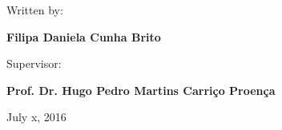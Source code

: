 \vspace{0.5cm}
\begin{center}
\begin{normalsize}
\begin{large}
Written by:
\end{large}
\end{normalsize}
\end{center}

\vspace{0.2cm}
\begin{center}
\begin{large}
\textbf{Filipa Daniela Cunha Brito}
\end{large}
\end{center}

\vspace{0,5cm}
\begin{center}
\begin{normalsize}
\begin{large}
Supervisor:
\end{large}
\end{normalsize}
\end{center}

\vspace{0.2cm}
\begin{center}
\begin{large}
\textbf{Prof. Dr. Hugo Pedro Martins Carriço Proença}
\end{large}
\end{center}



\vspace{0.5cm}
\begin{center}
\begin{normalsize}
July x, 2016
\end{normalsize}
\end{center}
